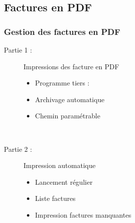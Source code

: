 \subsection{Factures en PDF}

\begin{frame}
	\frametitle{Gestion des factures en PDF}

	\begin{description}
		\item[Partie 1 :] Impressions des facture en PDF
			\begin{itemize}
				\item Programme tiers : \sautligne

				\item Archivage automatique
				\item Chemin paramétrable
			\end{itemize}~

		\item[Partie 2 : ] Impression automatique
			\begin{itemize}
				\item Lancement régulier\sautligne

				\item Liste factures
				\item Impression factures manquantes
			\end{itemize}
	\end{description}
\end{frame}
